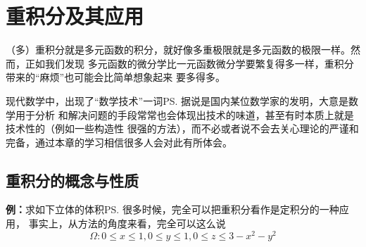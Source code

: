 \setcounter{chapter}{10}

\chapter{重积分及其应用}

（多）重积分就是多元函数的积分，就好像多重极限就是多元函数的极限一样。然而，正如我们发现
多元函数的微分学比一元函数微分学要繁复得多一样，重积分带来的“麻烦”也可能会比简单想象起来
要多得多。

现代数学中，出现了“数学技术”一词\ps{据说是国内某位数学家的发明}，大意是数学用于分析
和解决问题的手段常常也会体现出技术的味道，甚至有时本质上就是技术性的（例如一些构造性
很强的方法），而不必或者说不会去关心理论的严谨和完备，通过本章的学习相信很多人会对此有所体会。



\section{重积分的概念与性质}

{\bf 例：}求如下立体的体积\ps{很多时候，完全可以把重积分看作是定积分的一种应用，
事实上，从方法的角度来看，完全可以这么说}
$$\Omega:0\leq x\leq 1,0\leq y\leq 1,0\leq z\leq 3-x^2-y^2$$

